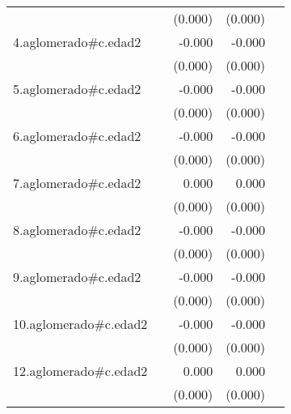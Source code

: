 {\begin{longtable}{l*{4}{D{.}{.}{-1}}}
            &                     &     (0.000)         &     (0.000)         &                     \\
\addlinespace
4.aglomerado#c.edad2&                     &      -0.000         &      -0.000\sym{***}&                     \\
            &                     &     (0.000)         &     (0.000)         &                     \\
\addlinespace
5.aglomerado#c.edad2&                     &      -0.000         &      -0.000         &                     \\
            &                     &     (0.000)         &     (0.000)         &                     \\
\addlinespace
6.aglomerado#c.edad2&                     &      -0.000         &      -0.000         &                     \\
            &                     &     (0.000)         &     (0.000)         &                     \\
\addlinespace
7.aglomerado#c.edad2&                     &       0.000         &       0.000         &                     \\
            &                     &     (0.000)         &     (0.000)         &                     \\
\addlinespace
8.aglomerado#c.edad2&                     &      -0.000         &      -0.000\sym{*}  &                     \\
            &                     &     (0.000)         &     (0.000)         &                     \\
\addlinespace
9.aglomerado#c.edad2&                     &      -0.000         &      -0.000\sym{*}  &                     \\
            &                     &     (0.000)         &     (0.000)         &                     \\
\addlinespace
10.aglomerado#c.edad2&                     &      -0.000         &      -0.000         &                     \\
            &                     &     (0.000)         &     (0.000)         &                     \\
\addlinespace
12.aglomerado#c.edad2&                     &       0.000         &       0.000         &                     \\
            &                     &     (0.000)         &     (0.000)         &                     \\

\end{longtable}}
